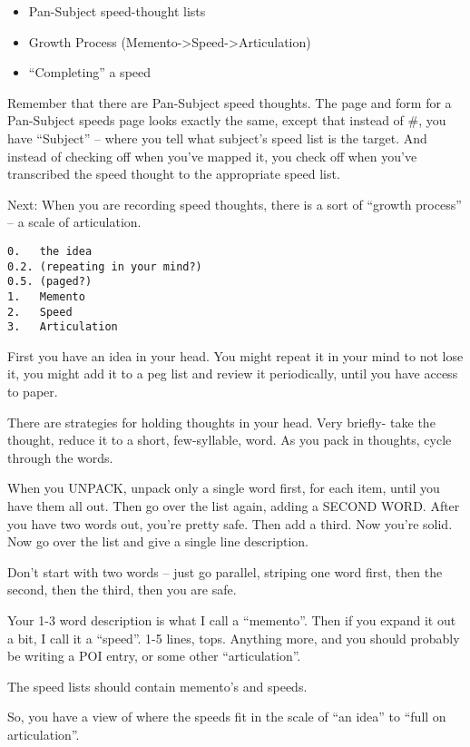 \documentclass[oneside]{scrbook}
\begin{document}
\begin{itemize}
  \item Pan-Subject speed-thought lists
  \item Growth Process (Memento->Speed->Articulation)
  \item ``Completing'' a speed
\end{itemize}

Remember that there are Pan-Subject speed thoughts. The page and form
for a Pan-Subject speeds page looks exactly the same, except that
instead of \#, you have ``Subject'' -- where you tell what subject's speed
list is the target. And instead of checking off when you've mapped it,
you check off when you've transcribed the speed thought to the
appropriate speed list.

Next: When you are recording speed thoughts, there is a sort of
``growth process'' -- a scale of articulation.

\begin{verbatim}
0.   the idea
0.2. (repeating in your mind?)
0.5. (paged?)
1.   Memento
2.   Speed
3.   Articulation
\end{verbatim}

First you have an idea in your head. You might repeat it in your mind
to not lose it, you might add it to a peg list and review it
periodically, until you have access to paper.

There are strategies for holding thoughts in your head. Very briefly-
take the thought, reduce it to a short, few-syllable, word. As you
pack in thoughts, cycle through the words.

When you UNPACK, unpack only a single word first, for each item, until
you have them all out. Then go over the list again, adding a SECOND
WORD. After you have two words out, you're pretty safe. Then add a
third. Now you're solid. Now go over the list and give a single line
description.

Don't start with two words -- just go parallel, striping one word first,
then the second, then the third, then you are safe.

Your 1-3 word description is what I call a ``memento''. Then if you
expand it out a bit, I call it a ``speed''. 1-5 lines, tops. Anything
more, and you should probably be writing a POI entry, or some other
``articulation''.

The speed lists should contain memento's and speeds.

So, you have a view of where the speeds fit in the scale of ``an idea''
to ``full on articulation''.
\end{document}
